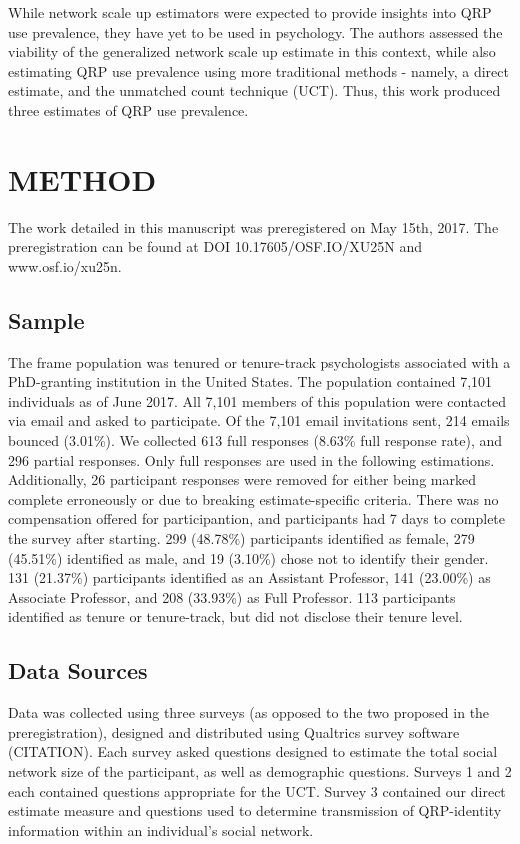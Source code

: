\documentclass[,jou]{apa6}
\theoremstyle{definition}
\theoremstyle{definition}
\theoremstyle{definition}
\theoremstyle{remark}
\begin{document}
While network scale up estimators were expected to provide insights into
QRP use prevalence, they have yet to be used in psychology. The authors
assessed the viability of the generalized network scale up estimate in
this context, while also estimating QRP use prevalence using more
traditional methods - namely, a direct estimate, and the unmatched count
technique (UCT). Thus, this work produced three estimates of QRP use
prevalence.

\section{METHOD}\label{method}

The work detailed in this manuscript was preregistered on May 15th,
2017. The preregistration can be found at DOI 10.17605/OSF.IO/XU25N and
www.osf.io/xu25n.

\subsection{Sample}\label{sample}

The frame population was tenured or tenure-track psychologists
associated with a PhD-granting institution in the United States. The
population contained 7,101 individuals as of June 2017. All 7,101
members of this population were contacted via email and asked to
participate. Of the 7,101 email invitations sent, 214 emails bounced
(3.01\%). We collected 613 full responses (8.63\% full response rate),
and 296 partial responses. Only full responses are used in the following
estimations. Additionally, 26 participant responses were removed for
either being marked complete erroneously or due to breaking
estimate-specific criteria. There was no compensation offered for
participantion, and participants had 7 days to complete the survey after
starting. 299 (48.78\%) participants identified as female, 279 (45.51\%)
identified as male, and 19 (3.10\%) chose not to identify their gender.
131 (21.37\%) participants identified as an Assistant Professor, 141
(23.00\%) as Associate Professor, and 208 (33.93\%) as Full Professor.
113 participants identified as tenure or tenure-track, but did not
disclose their tenure level.

\subsection{Data Sources}\label{data-sources}

Data was collected using three surveys (as opposed to the two proposed
in the preregistration), designed and distributed using Qualtrics survey
software (CITATION). Each survey asked questions designed to estimate
the total social network size of the participant, as well as demographic
questions. Surveys 1 and 2 each contained questions appropriate for the
UCT. Survey 3 contained our direct estimate measure and questions used
to determine transmission of QRP-identity information within an
individual's social network.
\end{document}
